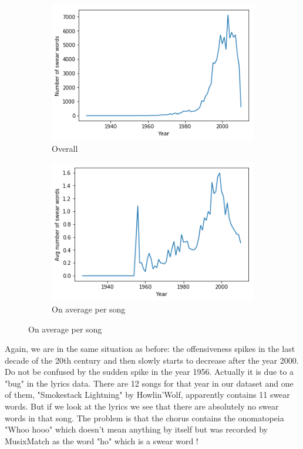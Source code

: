 \documentclass[11pt]{article}
\begin{document}
\begin{figure}
\centering
\begin{subfigure}[b]{0.45\textwidth}
\includegraphics[width=\textwidth]{plots/nb_words}
\caption{Overall}
\label{nb_words}
\end{subfigure}
\quad
\begin{subfigure}[b]{0.45\textwidth}
\includegraphics[width=\textwidth]{plots/nb_words_avg}
\caption{On average per song}
\label{nb_words_avg}
\end{subfigure}
\end{figure}

Again, we are in the same situation as before: the offensiveness spikes in the last decade of the 20th century and then slowly starts to decrease after the year 2000. Do not be confused by the sudden spike in the year 1956. Actually it is due to a "bug" in the lyrics data. There are 12 songs for that year in our dataset and one of them, "Smokestack Lightning" by Howlin'Wolf, apparently contains 11 swear words. But if we look at the lyrics we see that there are absolutely no swear words in that song. The problem is that the chorus contains the onomatopeia "Whoo hooo" which doesn't mean anything by itself but was recorded by MusixMatch as the word "ho" which is a swear word !
\end{document}
